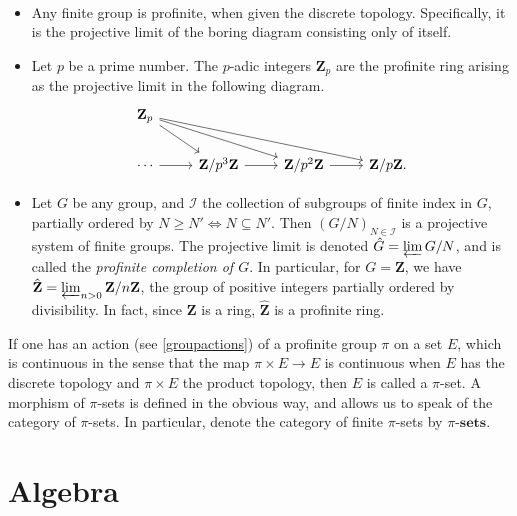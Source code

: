 \documentclass[11pt,openany]{book} %
\newcommand{\Z}{\mathbf{Z}}
\begin{document}
\begin{example}\
\begin{itemize}
	\item Any finite group is profinite, when given the discrete topology. Specifically, it is the projective limit of the boring diagram consisting only of itself.

	\item Let $p$ be a prime number. The $p$-adic integers $\Z_p$ are the profinite ring arising as the projective limit in the following diagram.
\[
\begin{tikzcd}
\Z_p \ar[rd] \ar[rrd] \ar[rrrd] \\
\cdots \ar[r] & \Z/p^3\Z \ar[r] & \Z/p^2\Z \ar[r] & \Z/p\Z.
\end{tikzcd}
\]

	\item Let $G$ be any group, and $\mathcal{I}$ the collection of subgroups of finite index in $G$, partially ordered by $N \geq N' \iff N \subseteq N'$. Then $(G/N)_{N \in \mathcal{I}}$ is a projective system of finite groups. The projective limit is denoted $\hat{G} = \varprojlim G/N$, and is called the \emph{profinite completion of $G$}. In particular, for $G = \Z$, we have $\hat{\Z} = \varprojlim_{n > 0} \Z/n\Z$, the group of positive integers partially ordered by divisibility. In fact, since $\Z$ is a ring, $\hat{\Z}$ is a profinite ring.
\end{itemize}
\end{example}

\medskip
If one has an action (see \ref{groupactions}) of a profinite group $\pi$ on a set $E$, which is continuous in the sense that the map $\pi \times E \to E$ is continuous when $E$ has the discrete topology and $\pi \times E$ the product topology, then $E$ is called a $\pi$-set. A morphism of $\pi$-sets is defined in the obvious way, and allows us to speak of the category of $\pi$-sets. In particular, denote the category of finite $\pi$-sets by $\pi$-$\mathbf{sets}$.


\section{Algebra}
\end{document}
